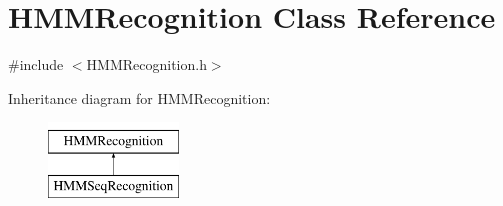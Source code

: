 \hypertarget{class_h_m_m_recognition}{\section{H\+M\+M\+Recognition Class Reference}
\label{class_h_m_m_recognition}
}


{\ttfamily \#include $<$H\+M\+M\+Recognition.\+h$>$}

Inheritance diagram for H\+M\+M\+Recognition\+:\begin{figure}[H]
\begin{center}
\leavevmode
\includegraphics[height=2.000000cm]{class_h_m_m_recognition}
\end{center}
\end{figure}
